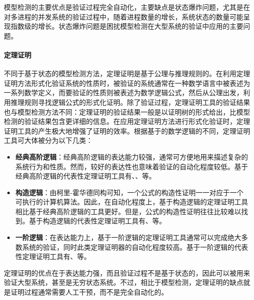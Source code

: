 模型检测的主要优点是验证过程完全自动化，主要缺点是状态爆炸问题，尤其是在对多进程的并发系统的验证过程中，随着进程数量的增长，系统状态的数量可能呈现指数级的增长。状态爆炸问题是困扰模型检测在大型系统的验证中应用的主要问题。

\paragraph{定理证明}
不同于基于状态的模型检测方法，定理证明\cite{Fitting96,Loveland78,Burel09}是基于公理与推理规则的。在利用定理证明方法形式化验证系统的性质时，被验证的系统通常在一种数学语言中被表述为一系列数学定义，而要验证的性质则被表述为数学逻辑公式，然后从公理出发，利用推理规则寻找逻辑公式的形式化证明。除了验证过程，定理证明工具的验证结果也与模型检测方法不同：定理证明的验证结果一般是以证明树的形式给出，比模型检测的验证结果包含更详细的信息。在应用定理证明方法进行形式化验证时，定理证明工具的产生极大地增强了证明的效率。根据基于的数学逻辑的不同，定理证明工具可大体被分为以下几类：
\begin{itemize}

	\item \textbf{经典高阶逻辑}：经典高阶逻辑的表达能力较强，通常可方便地用来描述复杂的系统行为和性质。然而，较好的表达性也意味着验证的自动化程度较低。基于经典高阶逻辑的代表性定理证明工具有\cite{Gordon00}、\cite{Nipkow12}、\cite{OwreRS92}等。
	\item \textbf{构造逻辑}：由柯里-霍华德同构\cite{PoernomoWC05}可知，一个公式的构造性证明一一对应于一个可执行的计算机算法。因此，在自动化程度上，基于构造逻辑的定理证明工具相比基于经典高阶逻辑的工具更好。但是，公式的构造性证明往往比较难以找到。基于构造逻辑的代表性定理证明工具有\cite{BertotC04}、\cite{AllenCEKL00}等。
	\item \textbf{一阶逻辑}：在表达能力上，基于一阶逻辑的定理证明工具通常可以完成绝大多数系统的验证，同时此类定理证明器的自动化程度较高。基于一阶逻辑的代表性定理证明工具有\cite{KaufmannM08}、\cite{cs-LO-9301106}等。
\end{itemize}
定理证明的优点在于表达能力强，而且验证过程不是基于状态的，因此可以被用来验证大型系统，甚至是无穷状态系统。不过，相比于模型检测，定理证明的缺点就是证明过程通常需要人工干预，而不是完全自动化的。

